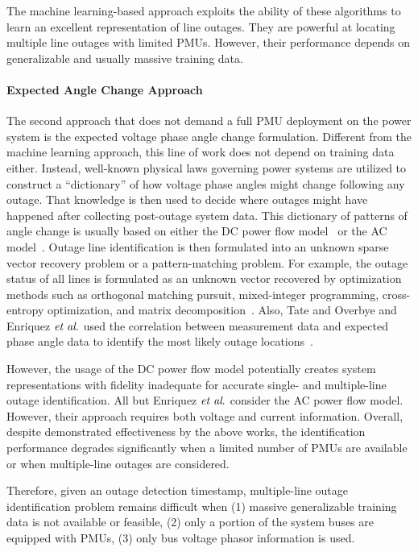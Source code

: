 The machine learning-based approach exploits the ability of these algorithms to learn an excellent representation of line outages. They are powerful at locating multiple line outages with limited PMUs. However, their performance depends on generalizable and usually massive training data.

\paragraph{Expected Angle Change Approach}
The second approach that does not demand a full PMU deployment on the power system is the expected voltage phase angle change formulation. Different from the machine learning approach, this line of work does not depend on training data either. Instead, well-known physical laws governing power systems are utilized to construct a ``dictionary'' of how voltage phase angles might change following any outage. That knowledge is then used to decide where outages might have happened after collecting post-outage system data. This dictionary of patterns of angle change is usually based on either the DC power flow model~\cite{Tate2008,tate2009double,Zhu2012,Emami2013,Chen2014,Wu2015} or the AC model~\cite{Costilla-Enriquez2019}. Outage line identification is then formulated into an unknown sparse vector recovery problem or a pattern-matching problem. 
For example, the outage status of all lines is formulated as an unknown vector recovered by optimization methods such as orthogonal matching pursuit, mixed-integer programming, cross-entropy optimization, and matrix decomposition~\cite{Zhu2012, Emami2013,Chen2014,Wu2015}. Also, Tate and Overbye and Enriquez $\textit{et al}.$ used the correlation between measurement data and expected phase angle data to identify the most likely outage locations~\cite{Tate2008,Costilla-Enriquez2019}. 

However, the usage of the DC power flow model potentially creates system representations with fidelity inadequate for accurate single- and multiple-line outage identification. All but Enriquez $\textit{et al}.$ consider the AC power flow model. However, their approach requires both voltage and current information. Overall, despite demonstrated effectiveness by the above works, the identification performance degrades significantly when a limited number of PMUs are available or when multiple-line outages are considered. 


Therefore, given an outage detection timestamp, multiple-line outage identification problem remains difficult when (1) massive generalizable training data is not available or feasible, (2) only a portion of the system buses are equipped with PMUs, (3) only bus voltage phasor information is used.  


